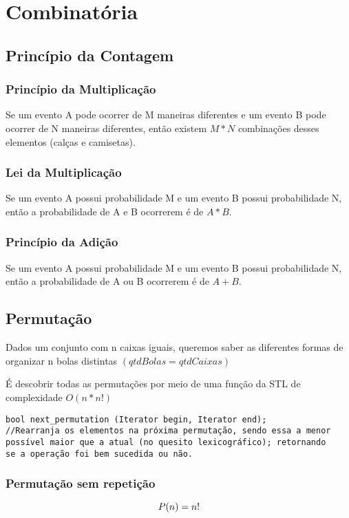 \section{Combinatória}

\subsection{Princípio da Contagem}
    \subsubsection{Princípio da Multiplicação}
        Se um evento A pode ocorrer de M maneiras diferentes e um evento B pode ocorrer de N maneiras diferentes,
        então existem $M*N$ combinações desses elementos (calças e camisetas).

    \subsubsection{Lei da Multiplicação}
        Se um evento A possui probabilidade M e um evento B possui probabilidade N,
        então a probabilidade de A e B ocorrerem é de $A*B$.

    \subsubsection{Princípio da Adição}
        Se um evento A possui probabilidade M e um evento B possui probabilidade N,
        então a probabilidade de A ou B ocorrerem é de $A+B$.

\subsection{Permutação}
    Dados um conjunto com n caixas iguais, queremos saber as diferentes formas de organizar n bolas distintas $(qtdBolas = qtdCaixas)$
    
    É descobrir todas as permutações por meio de uma função da STL de complexidade $O(n*n!)$
\begin{verbatim}
bool next_permutation (Iterator begin, Iterator end);
//Rearranja os elementos na próxima permutação, sendo essa a menor 
possível maior que a atual (no quesito lexicográfico); retornando 
se a operação foi bem sucedida ou não.    
\end{verbatim}
    
    \subsubsection{Permutação sem repetição}
    \begin{equation}
        \centering
        P(n) = n!
    \end{equation}

